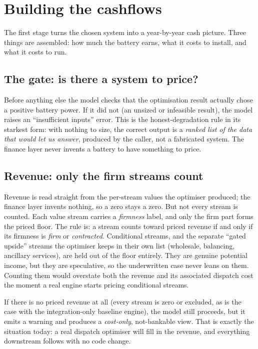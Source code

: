 \section{Building the cashflows}

The first stage turns the chosen system into a year-by-year cash picture. Three things are assembled: how much the battery earns, what it costs to install, and what it costs to run.

\subsection{The gate: is there a system to price?}

Before anything else the model checks that the optimisation result actually chose a positive battery power. If it did not (an unsized or infeasible result), the model raises an ``insufficient inputs'' error. This is the honest-degradation rule in its starkest form: with nothing to size, the correct output is a \emph{ranked list of the data that would let us answer}, produced by the caller, not a fabricated system. The finance layer never invents a battery to have something to price.

\subsection{Revenue: only the firm streams count}

Revenue is read straight from the per-stream values the optimiser produced; the finance layer invents nothing, so a zero stays a zero. But not every stream is counted. Each value stream carries a \emph{firmness} label, and only the firm part forms the priced floor. The rule is: a stream counts toward priced revenue if and only if its firmness is \emph{firm} or \emph{contracted}. Conditional streams, and the separate ``gated upside'' streams the optimiser keeps in their own list (wholesale, balancing, ancillary services), are held out of the floor entirely. They are genuine potential income, but they are speculative, so the underwritten case never leans on them. Counting them would overstate both the revenue and its associated dispatch cost the moment a real engine starts pricing conditional streams.

If there is no priced revenue at all (every stream is zero or excluded, as is the case with the integration-only baseline engine), the model still proceeds, but it emits a warning and produces a \emph{cost-only}, not-bankable view. That is exactly the situation today: a real dispatch optimiser will fill in the revenue, and everything downstream follows with no code change.

